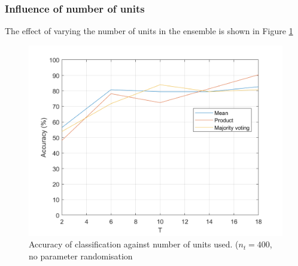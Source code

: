 \documentclass[10pt,technote]{IEEEtran}
\begin{document}
\subsubsection{Influence of number of units}
The effect of varying the number of units in the ensemble is shown in Figure \ref{fig:acc_vs_n_units}

\begin{figure}
    \centering
    \includegraphics{../results/ex2LDAEnsemble/acc_vs_n_unit.png}
    \caption{Accuracy of classification against number of units used. ($n_t = 400$, no parameter randomisation }
    \label{fig:acc_vs_n_units}
\end{figure}



%
%
\end{document}

